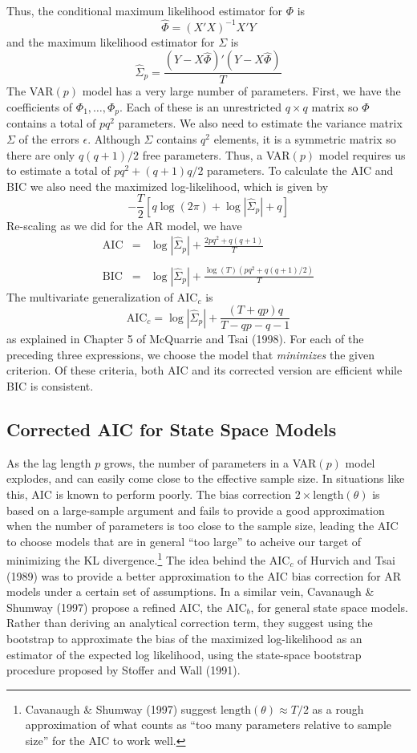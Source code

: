 \documentclass[12pt]{article}
\theoremstyle{definition}
\begin{document}
Thus, the conditional maximum likelihood estimator for $\Phi$ is
	$$\widehat{\Phi} = (X'X)^{-1} X'Y$$
and the maximum likelihood estimator for $\Sigma$ is
	$$\widehat{\Sigma}_p = \frac{\left(Y - X\widehat{\Phi}\right)'\left(Y - X\widehat{\Phi}\right)}{T}$$
The VAR$(p)$ model has a very large number of parameters. First, we have the coefficients of $\Phi_1, \hdots, \Phi_p$. Each of these is an unrestricted $q\times q$ matrix so $\Phi$ contains a total of $pq^2$ parameters. We also need to estimate the variance matrix $\Sigma$ of the errors $\epsilon$. Although $\Sigma$ contains $q^2$ elements, it is a symmetric matrix so there are only $q(q+1)/2$ free parameters. Thus, a VAR$(p)$ model requires us to estimate a total of $pq^2 + (q+1)q/2$ parameters. To calculate the AIC and BIC we also need the maximized log-likelihood, which is given by
	$$-\frac{T}{2} \left[q\log(2\pi) + \log \left| \widehat{\Sigma}_p\right| + q\right]$$
Re-scaling as we did for the AR model, we have
\begin{eqnarray*}
	\mbox{AIC} &=& \log \left| \widehat{\Sigma}_p\right| + \frac{2pq^2 + q(q+1)}{T}\\ \\
	\mbox{BIC} &=& \log \left| \widehat{\Sigma}_p\right| +  \frac{\log(T)(pq^2 + q(q+1)/2)}{T}
\end{eqnarray*}
The multivariate generalization of AIC$_c$ is
$$\mbox{AIC}_c = \log \left| \widehat{\Sigma}_p\right|  + \frac{(T + qp)q}{T - qp - q -1}$$
as explained in Chapter 5 of McQuarrie and Tsai (1998). For each of the preceding three expressions, we choose the model that \emph{minimizes} the given criterion. Of these criteria, both AIC and its corrected version are efficient while BIC is consistent. 

\subsection{Corrected AIC for State Space Models}
As the lag length $p$ grows, the number of parameters in a VAR$(p)$ model explodes, and can easily come close to the effective sample size. In situations like this, AIC is known to perform poorly. The bias correction $2\times \mbox{length}(\theta)$ is based on a large-sample argument and fails to provide a good approximation when the number of parameters is too close to the sample size, leading the AIC to choose models that are in general ``too large'' to acheive our target of minimizing the KL divergence.\footnote{Cavanaugh \& Shumway (1997) suggest $\mbox{length}(\theta) \approx T/2$ as a rough approximation of what counts as ``too many parameters relative to sample size'' for the AIC to work well.} The idea behind the AIC$_c$ of Hurvich and Tsai (1989) was to provide a better approximation to the AIC bias correction for AR models under a certain set of assumptions. In a similar vein, Cavanaugh \& Shumway (1997) propose a refined AIC, the AIC$_b$, for general state space models. Rather than deriving an analytical correction term, they suggest using the bootstrap to approximate the bias of the maximized log-likelihood as an estimator of the expected log likelihood, using the state-space bootstrap procedure proposed by Stoffer and Wall (1991).  
\end{document}
